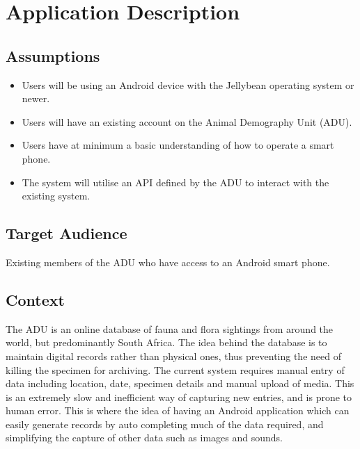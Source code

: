 \documentclass[
10pt, %
a4paper, %
oneside, %
headinclude,footinclude, %
BCOR5mm, %
]{scrartcl}
\begin{document}
\section{Application Description} %
\label{sec:application_description}

\subsection{Assumptions}
\label{sub:assumptions}

\begin{itemize}
\item Users will be using an Android device with the Jellybean operating system or newer.
\item Users will have an existing account on the Animal Demography Unit (ADU).
\item Users have at minimum a basic understanding of how to operate a smart phone.
\item The system will utilise an API defined by the ADU to interact with the existing system.
\end{itemize}


\subsection{Target Audience}
\label{sub:target_audience}

Existing members of the ADU who have access to an Android smart phone.


\subsection{Context}
\label{sub:context}

The ADU is an online database of fauna and flora sightings from around the world, but predominantly South Africa. The idea behind the database is to maintain digital records rather than physical ones, thus preventing the need of killing the specimen for archiving. The current system requires manual entry of data including location, date, specimen details and manual upload of media. This is an extremely slow and inefficient way of capturing new entries, and is prone to human error. This is where the idea of having an Android application which can easily generate records by auto completing much of the data required, and simplifying the capture of other data such as images and sounds. 
\end{document}
